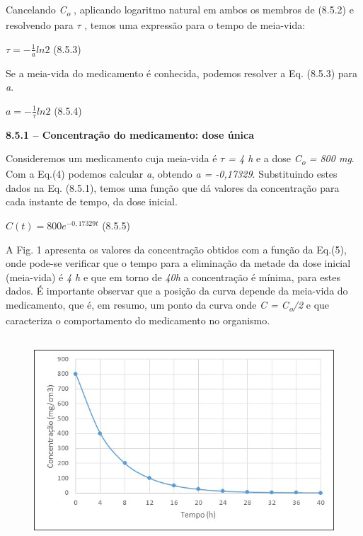 Cancelando \textit{C\textsubscript{o}} , aplicando logaritmo natural em ambos os membros de (8.5.2) e resolvendo para $ \tau$ , temos uma expressão para o tempo de meia-vida:

\begin{FlushRight}
 \(  \tau=-\frac{1}{a}ln2 \) \quad \quad \quad \quad \quad \quad (8.5.3)
\end{FlushRight}

Se a meia-vida do medicamento é conhecida, podemos resolver a Eq. (8.5.3) para \textit{a}. 

\begin{FlushRight}
 \( a=-\frac{1}{ \tau}ln2 \) \quad \quad \quad \quad \quad \quad (8.5.4)
\end{FlushRight}

{\fontsize{14pt}{16.8pt}\selectfont \textbf{8.5.1 – Concentração do medicamento: dose única}}

Consideremos um medicamento cuja meia-vida é \textit{$ \tau$  = 4 h} e a dose \textit{C\textsubscript{o} = 800 mg}. Com a Eq.(4) podemos calcular \textit{a}, obtendo \textit{a = -0,17329}. Substituindo estes dados na Eq. (8.5.1), temos uma função que dá valores da concentração para cada instante de tempo, da dose inicial.

\begin{FlushRight}
 \( C \left( t \right) =800e^{-0,17329 t} \) \quad \quad \quad \quad (8.5.5)
\end{FlushRight}

A Fig. 1 apresenta os valores da concentração obtidos com a função da Eq.(5), onde pode-se verificar que o tempo para a eliminação da metade da dose inicial (meia-vida) é \textit{4 h} e que em torno de \textit{40h} a concentração é mínima, para estes dados. É importante observar que a posição da curva depende da meia-vida do medicamento, que é, em resumo, um ponto da curva onde \textit{C = C\textsubscript{o}/2} e que caracteriza o comportamento do medicamento no organismo. 

\begin{figure}[H]
	\begin{Center}
		\includegraphics[width=5.01in,height=3.01in]{capitulos/logaritmos_e_funcao_logaritmica/media/image11.jpeg}
	\end{Center}
\end{figure}

